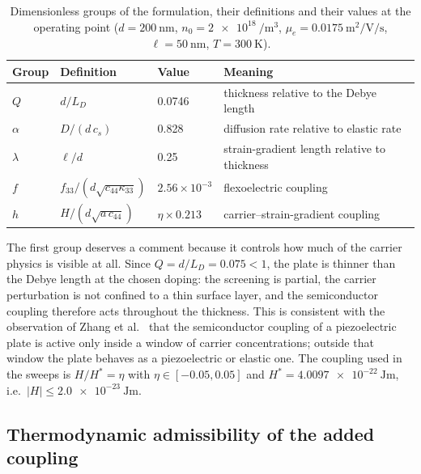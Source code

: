 \begin{table}[t]
\centering
\caption{Dimensionless groups of the formulation, their definitions and their
values at the operating point ($d=\SI{200}{\nano\metre}$, $n_0=\SI{2e18}{\per\cubic\metre}$,
$\mu_e=\SI{0.0175}{\square\metre\per\volt\per\second}$, $\ell=\SI{50}{\nano\metre}$,
$T=\SI{300}{\kelvin}$).}
\label{tab:groups}
\begin{tabular}{@{}llll@{}}
\toprule
Group & Definition & Value & Meaning \\
\midrule
$Q$ & $d/L_D$ & 0.0746 & thickness relative to the Debye length \\
$\alpha$ & $D/(d\,c_s)$ & 0.828 & diffusion rate relative to elastic rate \\
$\lambda$ & $\ell/d$ & 0.25 & strain-gradient length relative to thickness \\
$f$ & $f_{33}/(d\sqrt{c_{44}\kappa_{33}})$ & $2.56\times10^{-3}$ & flexoelectric coupling \\
$h$ & $H/(d\sqrt{a\,c_{44}})$ & $\eta\times0.213$ & carrier--strain-gradient coupling \\
\bottomrule
\end{tabular}
\end{table}

The first group deserves a comment because it controls how much of the carrier
physics is visible at all.  Since $Q=d/L_D=0.075<1$, the plate is thinner than
the Debye length at the chosen doping: the screening is partial, the carrier
perturbation is not confined to a thin surface layer, and the semiconductor
coupling therefore acts throughout the thickness.  This is consistent with the
observation of Zhang et al.\ \cite{zhang2025pscplate} that the semiconductor
coupling of a piezoelectric plate is active only inside a window of carrier
concentrations; outside that window the plate behaves as a piezoelectric or
elastic one.  The coupling used in the sweeps is
$H/H^{*}=\eta$ with $\eta\in[-0.05,0.05]$ and
$H^{*}=\SI{4.0097e-22}{\joule\metre}$, i.e.\
$|H|\le\SI{2.0e-23}{\joule\metre}$.

\subsection{Thermodynamic admissibility of the added coupling}
\label{sec:governing_stability}

